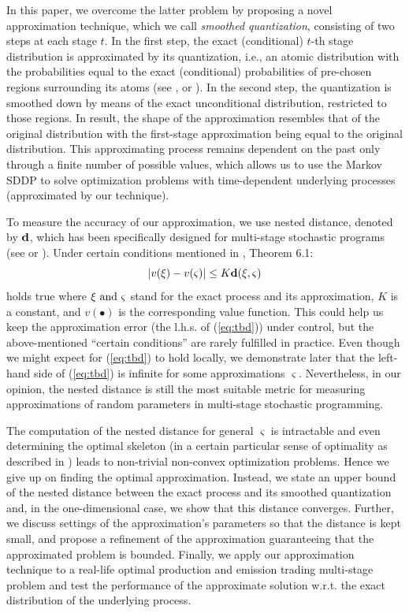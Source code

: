 \documentclass{article}              %
\begin{document}
In this paper, we overcome the latter problem by proposing a novel approximation technique, which we call \emph{smoothed quantization}, consisting of two steps at each stage $t$. In the first step, the exact
(conditional) $t$-th stage distribution is approximated by its quantization,
i.e., an atomic distribution with the probabilities equal to the exact
(conditional) probabilities of pre-chosen regions surrounding its
atoms (see \cite{lohndorf2019modeling}, \cite{kreitmeier2011optimal} or \cite{Pflug01}). In
the second step, the quantization is smoothed down by means of the
exact unconditional distribution, restricted to those regions. In
result, the shape of the approximation resembles that of the original distribution with the first-stage approximation being equal to the original distribution. This approximating process remains dependent on the past only through a finite number of possible values, which allows us to use the Markov SDDP to solve optimization problems with time-dependent underlying processes (approximated by our technique).

To measure the accuracy of our approximation, we use nested distance, denoted by 
$\mathbf{d}$, which has been specifically designed for multi-stage stochastic programs (see
\cite{pflug2012distance} or \cite{pflug2014multistage}). Under
certain conditions mentioned in \cite{pflug2014multistage}, Theorem 6.1:
\begin{equation}
|v(\xi)-v(\varsigma)|\leq K\mathbf{d}(\xi,\varsigma)\label{eq:tbd}
\end{equation}
holds true where $\text{\ensuremath{\xi} and \ensuremath{\varsigma}}$ stand for the
exact process and its approximation, $K$ is a constant, and $\ensuremath{v(\bullet)}$
is the corresponding value function. This could help us keep the approximation error (the l.h.s. of (\ref{eq:tbd})) under control, but the above-mentioned ``certain conditions'' are rarely
fulfilled in practice. Even though we might expect for (\ref{eq:tbd}) to hold
locally, we demonstrate later 
that the left-hand side of (\ref{eq:tbd}) is infinite for some approximations $\varsigma$.
Nevertheless, in our opinion, the nested distance is still the most
suitable metric for measuring approximations of random parameters in multi-stage stochastic programming.


The computation of the nested distance for general $\varsigma$ is intractable and even determining the optimal skeleton (in a certain particular sense of optimality as described in \cite{lohndorf2019modeling}) leads to non-trivial non-convex optimization problems. Hence  we give up on finding the optimal approximation. Instead, we state an upper bound
of the nested distance between the exact process and its smoothed
quantization and, in the one-dimensional
case, we show that this distance converges. Further, we discuss settings of the approximation's parameters so
that the distance is kept small, and propose a refinement of the
approximation guaranteeing that the approximated problem is bounded. 
Finally, we apply our
approximation technique to a real-life optimal production and emission
trading multi-stage problem and test the performance of the approximate
solution w.r.t. the exact distribution of the underlying process.
\end{document}
